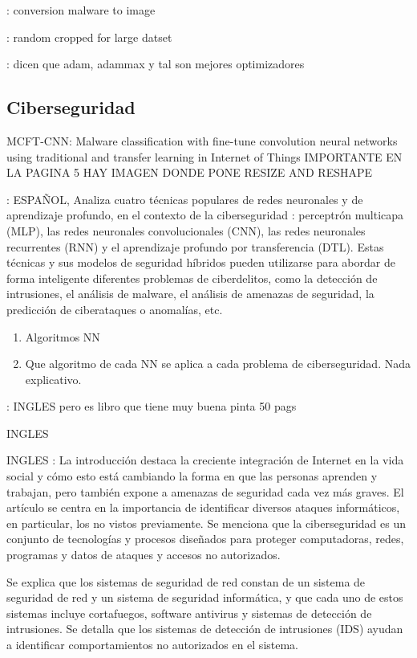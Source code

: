\documentclass[11pt, a4paper]{article} %
\begin{document}
\citep{luo2017binary} : conversion malware to image 

\citep{simonyan2014very} : random cropped for large datset


\citep{habibi2023performance} : dicen que adam, adammax y tal son mejores optimizadores

\subsection{Ciberseguridad}

MCFT-CNN: Malware classification with fine-tune convolution neural
networks using traditional and transfer learning in Internet of Things IMPORTANTE EN LA PAGINA 5 HAY IMAGEN DONDE PONE RESIZE AND RESHAPE

\cite{yagual2022revision} : ESPAÑOL, Analiza cuatro técnicas populares de redes neuronales y de aprendizaje profundo, en el contexto de la ciberseguridad : perceptrón multicapa (MLP), las redes neuronales convolucionales (CNN), las redes neuronales recurrentes (RNN) y el aprendizaje profundo por transferencia (DTL). Estas técnicas y sus modelos de seguridad híbridos pueden utilizarse para abordar de forma inteligente diferentes problemas de ciberdelitos, como la detección de intrusiones, el análisis de malware, el análisis de amenazas de seguridad, la predicción de ciberataques o anomalías, etc. 
\begin{enumerate}
\item Algoritmos NN
\item Que algoritmo de cada NN se aplica a cada problema de ciberseguridad. Nada explicativo.
\end{enumerate}

\citep{omar2022machine} : INGLES pero es libro que tiene muy buena pinta 50 pags

\citep{sarker2020cybersecurity} INGLES

\citep{xin2018machine} INGLES : La introducción destaca la creciente integración de Internet en la vida social y cómo esto está cambiando la forma en que las personas aprenden y trabajan, pero también expone a amenazas de seguridad cada vez más graves. El artículo se centra en la importancia de identificar diversos ataques informáticos, en particular, los no vistos previamente. Se menciona que la ciberseguridad es un conjunto de tecnologías y procesos diseñados para proteger computadoras, redes, programas y datos de ataques y accesos no autorizados.

Se explica que los sistemas de seguridad de red constan de un sistema de seguridad de red y un sistema de seguridad informática, y que cada uno de estos sistemas incluye cortafuegos, software antivirus y sistemas de detección de intrusiones. Se detalla que los sistemas de detección de intrusiones (IDS) ayudan a identificar comportamientos no autorizados en el sistema.
\end{document}
